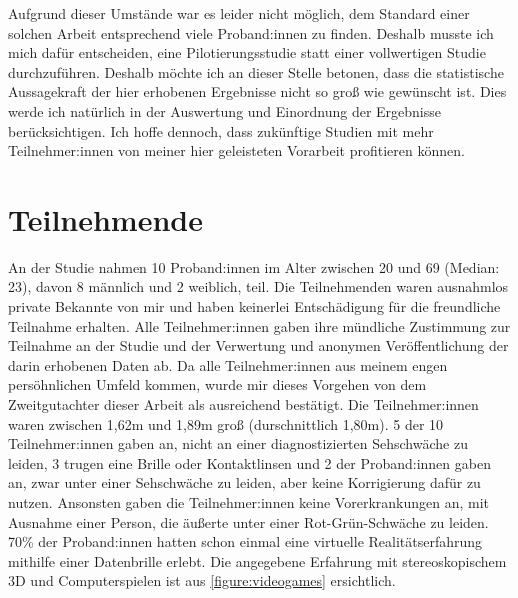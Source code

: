         Aufgrund dieser Umstände war es leider nicht möglich, dem Standard einer solchen Arbeit entsprechend viele Proband:innen zu finden. Deshalb musste ich mich dafür entscheiden, eine Pilotierungsstudie statt einer vollwertigen Studie durchzuführen. Deshalb möchte ich an dieser Stelle betonen, dass die statistische Aussagekraft der hier erhobenen Ergebnisse nicht so groß wie gewünscht ist. Dies werde ich natürlich in der Auswertung und Einordnung der Ergebnisse berücksichtigen. Ich hoffe dennoch, dass zukünftige Studien mit mehr Teilnehmer:innen von meiner hier geleisteten Vorarbeit profitieren können.

    \section{Teilnehmende}\label{sec:participants}
        An der Studie nahmen 10 Proband:innen im Alter zwischen 20 und 69 (Median: 23), davon 8 männlich und 2 weiblich, teil. Die Teilnehmenden waren ausnahmlos private Bekannte von mir und haben keinerlei Entschädigung für die freundliche Teilnahme erhalten. Alle Teilnehmer:innen gaben ihre mündliche Zustimmung zur Teilnahme an der Studie und der Verwertung und anonymen Veröffentlichung der darin erhobenen Daten ab. Da alle Teilnehmer:innen aus meinem engen persöhnlichen Umfeld kommen, wurde mir dieses Vorgehen von dem Zweitgutachter dieser Arbeit als ausreichend bestätigt.
        Die Teilnehmer:innen waren zwischen 1,62m und 1,89m groß (durschnittlich 1,80m).
        5 der 10 Teilnehmer:innen gaben an, nicht an einer diagnostizierten Sehschwäche zu leiden, 3 trugen eine Brille oder Kontaktlinsen und 2 der Proband:innen gaben an, zwar unter einer Sehschwäche zu leiden, aber keine Korrigierung dafür zu nutzen. Ansonsten gaben die Teilnehmer:innen keine Vorerkrankungen an, mit Ausnahme einer Person, die äußerte unter einer Rot-Grün-Schwäche zu leiden.
        70\% der Proband:innen hatten schon einmal eine virtuelle Realitätserfahrung mithilfe einer Datenbrille erlebt. Die angegebene Erfahrung mit stereoskopischem 3D und Computerspielen ist aus \autoref{figure:videogames} ersichtlich.

